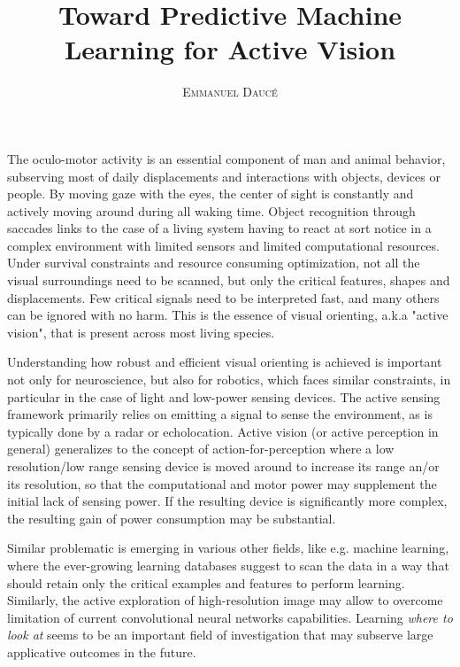 \documentclass[12pt,twoside,openright]{article}
\title{\textbf{Toward Predictive Machine Learning for Active Vision} }
\author{\textsc{Emmanuel Daucé}}%
\date{}
\begin{document}
	
\maketitle
	
	The oculo-motor activity is an essential component of man and animal behavior, subserving most of daily displacements and interactions with objects, devices or people. By moving gaze with the eyes, the center of sight is constantly and actively moving around during all waking time.  %
	Object recognition through saccades links to the case of a living system having to react at sort notice in a complex environment with limited sensors and limited computational resources. Under survival constraints and resource consuming optimization, not all the visual surroundings need to be scanned, but only the critical features, shapes and displacements. Few critical signals need to be interpreted fast, and many others can be ignored with no harm. This is the essence of visual orienting, a.k.a "active vision", that is present across most living species.  
	
	Understanding how robust and efficient visual orienting is achieved is important not only for neuroscience, but also for robotics, which faces similar constraints, in particular in the case of light and low-power sensing devices.  The active sensing framework primarily relies on emitting a signal to sense the environment, as is typically done by a radar or echolocation. Active vision (or active perception in general) generalizes to the concept of action-for-perception where a low resolution/low range sensing device is moved around to increase its range an/or its resolution, so that the computational and motor power may supplement the initial lack of sensing power. If the resulting device is significantly more complex, the resulting gain of power consumption may be substantial.
	  
	Similar problematic is emerging in various other fields, like e.g. machine learning, where the ever-growing  learning databases suggest to scan the data in a way that should retain only the critical examples and features to perform learning. Similarly, the active exploration of high-resolution image may allow to overcome limitation of current convolutional neural networks capabilities. Learning \emph{where to look at} seems to be an important field of investigation that may subserve large applicative outcomes in the future.
	
\end{document}
